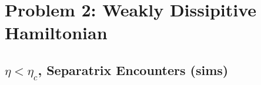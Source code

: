 \documentclass[
        fleqn,
        usenatbib,
    ]{mnras}
\newcommand*{\rd}[2]{\frac{\mathrm{d}#1}{\mathrm{d}#2}}
\newcommand*{\pd}[2]{\frac{\partial#1}{\partial#2}}
\newcommand*{\p}[1]{\left(#1\right)}
\newcommand*{\s}[1]{\left[#1\right]}
\begin{document}




\section{Problem 2: Weakly Dissipitive Hamiltonian}\label{s:p2}

\subsection{$\eta < \eta_c$, Separatrix Encounters (sims)}\label{ss:p2_lt}
\end{document}
